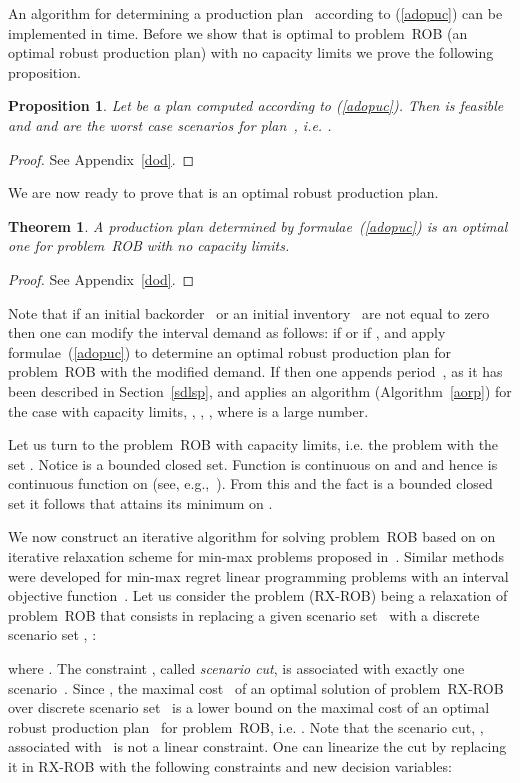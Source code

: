 \documentclass[11pt]{article}
\newtheorem{prop}{Proposition}
\newtheorem{thm}{Theorem}
\begin{document}
An algorithm for determining a production plan~ according to (\ref{adopuc})
can be implemented in  time. 
Before we show that  is optimal to  problem~\textsc{ROB}
(an optimal robust production plan)
 with no capacity
limits we prove the following proposition.
\begin{prop}
Let  be a plan computed according to (\ref{adopuc}). Then
 is feasible and
 and  are the worst case scenarios for 
plan~, i.e.
.
\label{pwcs}
\end{prop}
\begin{proof}
See Appendix~\ref{dod}.
\end{proof}
We are now ready to prove 
that  is an optimal robust production plan.
\begin{thm}
A production plan determined by formulae~(\ref{adopuc}) is
an optimal one for problem~\textsc{ROB} with no capacity
limits.
\label{tncrob}
\end{thm}
\begin{proof}
See Appendix~\ref{dod}.
\end{proof}
Note that 
if   an initial backorder~ or an initial inventory~
are not equal to zero then one can modify the interval demand  as follows:
  if  or
 if ,
and apply 
formulae~(\ref{adopuc}) to determine an optimal robust production plan for  problem~\textsc{ROB}
with the modified demand.
If  then one appends period~, as it has been described in Section~\ref{sdlsp},
and  applies an algorithm (Algorithm~\ref{aorp}) for the case with  capacity
limits, , , , where  is a large number.


Let us turn to  the problem~\textsc{ROB} with  capacity
limits, i.e. the problem with the set 
.
Notice  is a bounded closed set.
Function  is continuous on 
 and  and hence  is continuous
function on  (see, e.g.,~\cite[Theorem~1.4]{M70}). From this and  the fact
 is a bounded closed set it follows that 
 attains its minimum on .



We now construct an iterative algorithm for solving problem~\textsc{ROB} based on
on iterative relaxation  scheme for min-max problems proposed in~\cite{SA80}.
Similar methods were developed for min-max regret linear programming problems
with an interval objective function~\cite{IS95,ML99}.
Let us consider the problem (\textsc{RX-ROB})
being a relaxation of  problem~\textsc{ROB}  that consists in 
replacing a given scenario set~ with a discrete scenario set
, :

where .
The constraint 
,
called \emph{scenario cut}, is associated with exactly one scenario~.
Since , the maximal cost~ of
an optimal solution  of problem~\textsc{RX-ROB} 
over discrete scenario set~
is a lower bound on
the maximal cost of an optimal robust production plan~ for
problem~\textsc{ROB}, i.e. .
Note that the scenario cut, ,
associated with~
 is not a linear constraint. One can linearize the cut
by replacing it in \textsc{RX-ROB} with the following  constraints 
and  new decision variables:
\end{document}
